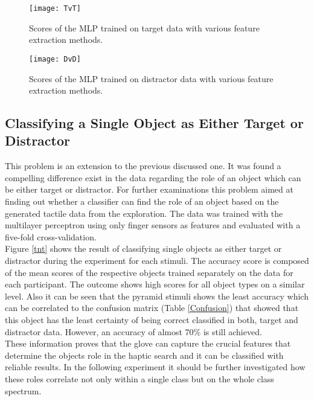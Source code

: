 
\begin{figure}[H]
		\centering
		\texttt{[image: TvT]}
		\caption{Scores of the MLP trained on target data with various feature extraction methods.}
		\label{tvt}
\end{figure}
\begin{figure}[H]
		\centering
		\texttt{[image: DvD]}
		\caption{Scores of the MLP trained on distractor data with various feature extraction methods.}
		\label{dvd}
\end{figure}


\subsection{Classifying a Single Object as Either Target or Distractor}
This problem is an extension to the previous discussed one. It was found a compelling difference exist in the data regarding the role of an object which can be either target or distractor. For further examinations this problem aimed at finding out whether a classifier can find the role of an object based on the generated tactile data from the exploration. The data was trained with the multilayer perceptron using only finger sensors as features and evaluated with a five-fold cross-validation. \\
Figure \ref{tnt} shows the result of classifying single objects as either target or distractor during the experiment for each stimuli. The accuracy score is composed of the mean scores of the respective objects trained separately on the data for each participant. The outcome shows high scores for all object types on a similar level. Also it can be seen that the pyramid stimuli shows the least accuracy which can be correlated to the confusion matrix (Table \ref{Confusion}) that showed that this object has the least certainty of being correct classified in both, target and distractor data. However, an accuracy of almost 70\% is still achieved. \\
These information proves that the glove can capture the crucial features that determine the objects role in the haptic search and it can be classified with reliable results. In the following experiment it should be further investigated how these roles correlate not only within a single class but on the whole class spectrum.  
 
